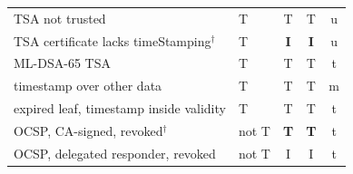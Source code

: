 \begin{table}[t]
\begin{tabular}{llccc}
TSA not trusted & T & T & T & u\\
TSA certificate lacks timeStamping$^\dagger$ & T & \textbf{I} & \textbf{I} & u\\
ML-DSA-65 TSA & T & T & T & t\\
\quad timestamp over other data & T & T & T & m\\
\quad expired leaf, timestamp inside validity & T & T & T & t\\
OCSP, CA-signed, revoked$^\dagger$ & not T & \textbf{T} & \textbf{T} & t\\
OCSP, delegated responder, revoked & not T & I & I & t\\
\bottomrule
\end{tabular}
\end{table}
